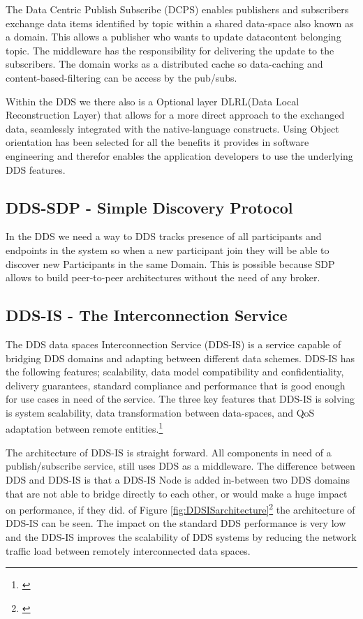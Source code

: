 The Data Centric Publish Subscribe (DCPS) enables publishers and subscribers exchange
data items identified by topic within a shared data-space also known as a domain. This allows a publisher who wants to update datacontent belonging topic. The middleware has the responsibility for delivering the update to the subscribers. The domain works as a distributed cache so data-caching and content-based-filtering can be access by the pub/subs.

Within the DDS we there also is a Optional layer DLRL(Data Local Reconstruction Layer) that allows for a more direct approach to the exchanged data, seamlessly integrated with the native-language
constructs. Using Object orientation has been selected for all the benefits it provides in software engineering and therefor enables the application developers to use the underlying DDS features.

\subsection{DDS-SDP - Simple Discovery Protocol}
In the DDS we need a way to DDS tracks presence of all participants and endpoints in the system so when a new participant join they will be able to discover new Participants in the same Domain. This is possible because SDP allows to build peer-to-peer architectures without the need of any broker. 

\subsection{DDS-IS - The Interconnection Service}
The DDS data spaces Interconnection Service (DDS-IS) is a service capable of bridging DDS domains and adapting between different data schemes. DDS-IS has the following features; scalability, data model compatibility and confidentiality, delivery guarantees, standard compliance and performance that is good enough for use cases in need of the service. The three key features that DDS-IS is solving is system scalability, data transformation between data-spaces, and QoS adaptation between remote entities.\footnote{\cite{Lopez-Vega2013}}

The architecture of DDS-IS is straight forward. All components in need of a publish/subscribe service, still uses DDS as a middleware. The difference between DDS and DDS-IS is that a DDS-IS Node is added in-between two DDS domains that are not able to bridge directly to each other, or would make a huge impact on performance, if they did. of Figure \ref{fig:DDSISarchitecture}\footnote{\cite{Lopez-Vega2013}} the architecture of DDS-IS can be seen. The impact on the standard DDS performance is very low and the DDS-IS improves the scalability of DDS systems by reducing the network traffic load between remotely interconnected data spaces.

